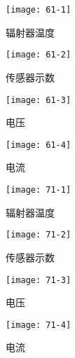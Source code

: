 \documentclass[dvipsnames, svgnames,a4paper,11pt]{article}
\begin{document}
\begin{figure}[H]
    \centering
    \begin{minipage}[b]{0.23\linewidth}
        \centering
        \texttt{[image: 61-1]}
        \caption{辐射器温度}
    \end{minipage}
    \hfill
    \begin{minipage}[b]{0.23\linewidth}
        \centering
        \texttt{[image: 61-2]}
        \caption{传感器示数}
    \end{minipage}
    \hfill
    \begin{minipage}[b]{0.23\linewidth}
        \centering
        \texttt{[image: 61-3]}
        \caption{电压}
    \end{minipage}
    \hfill
    \begin{minipage}[b]{0.23\linewidth}
        \centering
        \texttt{[image: 61-4]}
        \caption{电流}
    \end{minipage}
\end{figure}
\begin{figure}[H]
    \centering
    \begin{minipage}[b]{0.23\linewidth}
        \centering
        \texttt{[image: 71-1]}
        \caption{辐射器温度}
    \end{minipage}
    \hfill
    \begin{minipage}[b]{0.23\linewidth}
        \centering
        \texttt{[image: 71-2]}
        \caption{传感器示数}
    \end{minipage}
    \hfill
    \begin{minipage}[b]{0.23\linewidth}
        \centering
        \texttt{[image: 71-3]}
        \caption{电压}
    \end{minipage}
    \hfill
    \begin{minipage}[b]{0.23\linewidth}
        \centering
        \texttt{[image: 71-4]}
        \caption{电流}
    \end{minipage}
\end{figure}

\end{document}
